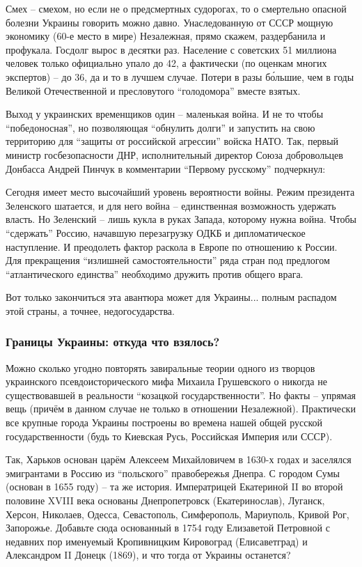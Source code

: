 Смех – смехом, но если не о предсмертных судорогах, то о смертельно опасной
болезни Украины говорить можно давно. Унаследованную от СССР мощную экономику
(60-е место в мире) Незалежная, прямо скажем, раздербанила и профукала. Госдолг
вырос в десятки раз. Население с советских 51 миллиона человек только
официально упало до 42, а фактически (по оценкам многих экспертов) – до 36, да
и то в лучшем случае. Потери в разы бо́льшие, чем в годы Великой Отечественной и
пресловутого \enquote{голодомора} вместе взятых.

Выход у украинских временщиков один – маленькая война. И не то чтобы
\enquote{победоносная}, но позволяющая \enquote{обнулить долги} и запустить на
свою территорию для \enquote{защиты от российской агрессии} войска НАТО. Так,
первый министр госбезопасности ДНР, исполнительный директор Союза добровольцев
Донбасса Андрей Пинчук в комментарии \enquote{Первому русскому} подчеркнул:

\begin{zzquote}
Сегодня имеет место высочайший уровень вероятности войны. Режим президента
Зеленского шатается, и для него война – единственная возможность удержать
власть. Но Зеленский – лишь кукла в руках Запада, которому нужна война. Чтобы
\enquote{сдержать} Россию, начавшую перезагрузку ОДКБ и дипломатическое
наступление. И преодолеть фактор раскола в Европе по отношению к России. Для
прекращения \enquote{излишней самостоятельности} ряда стран под предлогом
\enquote{атлантического единства} необходимо дружить против общего врага.	
\end{zzquote}

Вот только закончиться эта авантюра может для Украины... полным распадом этой
страны, а точнее, недогосударства.

\subsubsection{Границы Украины: откуда что взялось?}

Можно сколько угодно повторять завиральные теории одного из творцов украинского
псевдоисторического мифа Михаила Грушевского о никогда не существовавшей в
реальности \enquote{козацкой государственности}. Но факты – упрямая вещь (причём в
данном случае не только в отношении Незалежной). Практически все крупные города
Украины построены во времена нашей общей русской государственности (будь то
Киевская Русь, Российская Империя или СССР).

Так, Харьков основан царём Алексеем Михайловичем в 1630-х годах и заселялся
эмигрантами в Россию из \enquote{польского} правобережья Днепра. С городом Сумы
(основан в 1655 году) – та же история. Императрицей Екатериной II во второй
половине XVIII века основаны Днепропетровск (Екатеринослав), Луганск, Херсон,
Николаев, Одесса, Севастополь, Симферополь, Мариуполь, Кривой Рог, Запорожье.
Добавьте сюда основанный в 1754 году Елизаветой Петровной с недавних пор
именуемый Кропивницким Кировоград (Елисаветград) и Александром II Донецк
(1869), и что тогда от Украины останется?

